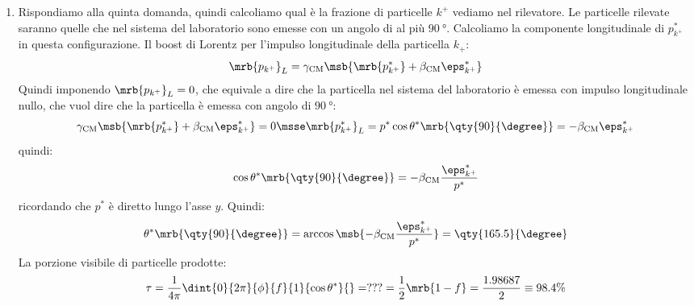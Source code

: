 \begin{example}
\begin{enumerate}
		\item Rispondiamo alla quinta domanda, quindi calcoliamo qual è la frazione
		      di particelle $k^+$ vediamo nel rilevatore.
		      Le particelle rilevate saranno quelle che nel sistema del laboratorio
		      sono emesse con un angolo di al più $\qty{90}{\degree}$.
		      Calcoliamo la componente longitudinale di $p ^{\ast}_{k^+}$ in questa
		      configurazione.
		      Il boost di Lorentz per l'impulso longitudinale della particella
		      $k_+$:
		      \begin{equation}
			      \mrb{p _{k^+}}_{L}
			      = \gamma _{\text{CM}} \msb{
				      \mrb{p _{k^+} ^{\ast}} + \beta _{\text{CM}} \eps _{k^+}^{\ast}
			      }
		      \end{equation}
		      Quindi imponendo $\mrb{p _{k^+}}_{L} = 0$, che equivale a dire che la
		      particella nel sistema del laboratorio è emessa con impulso
		      longitudinale nullo, che vuol dire che la particella è emessa con
		      angolo di $\qty{90}{\degree}$:
		      \begin{equation}
			      \gamma _{\text{CM}} \msb{
				      \mrb{p _{k^+} ^{\ast}} + \beta _{\text{CM}} \eps _{k^+}^{\ast}
			      } = 0
			      \msse
			      \mrb{p _{k^+}^{\ast}}_{L}
			      = p ^{\ast} \cos \theta^\ast \mrb{\qty{90}{\degree}}
			      = - \beta _\text{CM} \eps _{k^+}^{\ast}
		      \end{equation}
		      quindi:
		      \begin{equation}
			      \cos \theta^\ast \mrb{\qty{90}{\degree}}
			      = - \beta _\text{CM} \frac{\eps _{k^+}^{\ast}}{p ^{\ast}}
		      \end{equation}
		      ricordando che $p^\ast$ è diretto lungo l'asse $y$.
		      Quindi:
		      \begin{equation}
			      \theta ^{\ast} \mrb{\qty{90}{\degree}}
			      = \arccos \msb{- \beta _\text{CM} \frac{\eps _{k^+}^{\ast}}{p ^{\ast}}}
			      = \qty{165.5}{\degree}
		      \end{equation}
		      La porzione visibile di particelle prodotte:
		      \begin{equation}
			      \tau
			      = \frac{1}{4 \pi} \dint{0}{2 \pi}{\phi}{f}{1}{\cos \theta^\ast}{}
			      = ??? %
			      = \frac{1}{2} \mrb{1 - f} = \frac{1.98687}{2}
			      \equiv 98.4 \%
		      \end{equation}
	\end{enumerate}
\end{example}
